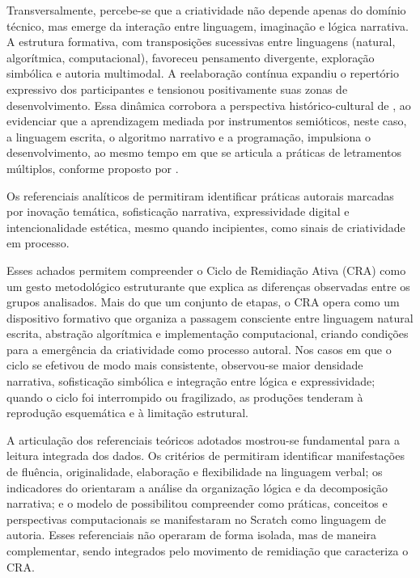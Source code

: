 \documentclass[portuguese]{textolivre}
\begin{document}
Transversalmente, percebe-se que a criatividade não depende apenas do domínio técnico, mas emerge da interação entre linguagem, imaginação e lógica narrativa. A estrutura formativa, com transposições sucessivas entre linguagens (natural, algorítmica, computacional), favoreceu pensamento divergente, exploração simbólica e autoria multimodal. A reelaboração contínua expandiu o repertório expressivo dos participantes e tensionou positivamente suas zonas de desenvolvimento. Essa dinâmica corrobora a perspectiva histórico-cultural de \textcite{vygotsky2007}, ao evidenciar que a aprendizagem mediada por instrumentos semióticos, neste caso, a linguagem escrita, o algoritmo narrativo e a programação, impulsiona o desenvolvimento, ao mesmo tempo em que se articula a práticas de letramentos múltiplos, conforme proposto por \textcite{rojo2012}.

Os referenciais analíticos de \textcite{torrance1995,brennan2012,cieb2024} permitiram identificar práticas autorais marcadas por inovação temática, sofisticação narrativa, expressividade digital e intencionalidade estética, mesmo quando incipientes, como sinais de criatividade em processo.

Esses achados permitem compreender o Ciclo de Remidiação Ativa (CRA) como um gesto metodológico estruturante que explica as diferenças observadas entre os grupos analisados. Mais do que um conjunto de etapas, o CRA opera como um dispositivo formativo que organiza a passagem consciente entre linguagem natural escrita, abstração algorítmica e implementação computacional, criando condições para a emergência da criatividade como processo autoral. Nos casos em que o ciclo se efetivou de modo mais consistente, observou-se maior densidade narrativa, sofisticação simbólica e integração entre lógica e expressividade; quando o ciclo foi interrompido ou fragilizado, as produções tenderam à reprodução esquemática e à limitação estrutural.

A articulação dos referenciais teóricos adotados mostrou-se fundamental para a leitura integrada dos dados. Os critérios de \textcite{torrance1995} permitiram identificar manifestações de fluência, originalidade, elaboração e flexibilidade na linguagem verbal; os indicadores do \textcite{cieb2024} orientaram a análise da organização lógica e da decomposição narrativa; e o modelo de \textcite{brennan2012} possibilitou compreender como práticas, conceitos e perspectivas computacionais se manifestaram no Scratch como linguagem de autoria. Esses referenciais não operaram de forma isolada, mas de maneira complementar, sendo integrados pelo movimento de remidiação que caracteriza o CRA.
\end{document}
